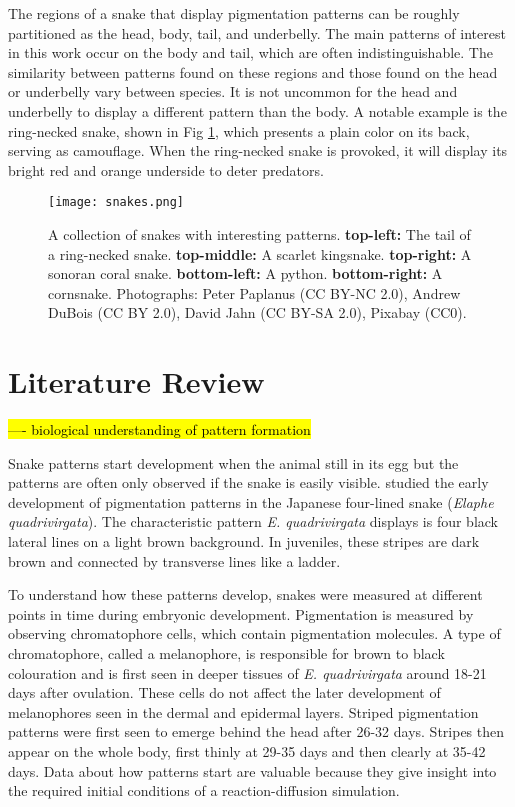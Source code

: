 The regions of a snake that display pigmentation patterns can be roughly partitioned as the head, body, tail, and underbelly. The main patterns of interest in this work occur on the body and tail, which are often indistinguishable. The similarity between patterns found on these regions and those found on the head or underbelly vary between species. It is not uncommon for the head and underbelly to display a different pattern than the body. A notable example is the ring-necked snake, shown in Fig \ref{fig:realSnakePatterns}, which presents a plain color on its back, serving as camouflage. When the ring-necked snake is provoked, it will display its bright red and orange underside to deter predators.


\begin{figure}[hb]
	\centering
	\texttt{[image: snakes.png]}
	\caption{A collection of snakes with interesting patterns. \textbf{top-left:} The tail of a ring-necked snake. \textbf{top-middle:} A scarlet kingsnake. \textbf{top-right:} A sonoran coral snake. \textbf{bottom-left:} A python. \textbf{bottom-right:} A cornsnake. \textcolor{citation-gray}{Photographs: Peter Paplanus (CC BY-NC 2.0), Andrew DuBois (CC BY 2.0), David Jahn (CC BY-SA 2.0), Pixabay (CC0).}}
	\label{fig:realSnakePatterns}
\end{figure}

\section{Literature Review}

\hl{---- biological understanding of pattern formation}

Snake patterns start development when the animal still in its egg but the patterns are often only observed if the snake is easily visible. \citet{murakami2018} studied the early development of pigmentation patterns in the Japanese four-lined snake (\textit{Elaphe quadrivirgata}). The characteristic pattern \textit{E. quadrivirgata} displays is four black lateral lines on a light brown background. In juveniles, these stripes are dark brown and connected by transverse lines like a ladder. 
 
To understand how these patterns develop, snakes were measured at different points in time during embryonic development. Pigmentation is measured by observing chromatophore cells, which contain pigmentation molecules. A type of chromatophore, called a melanophore, is responsible for brown to black colouration and is first seen in deeper tissues of \textit{E. quadrivirgata} around 18-21 days after ovulation. These cells do not affect the later development of melanophores seen in the dermal and epidermal layers. Striped pigmentation patterns were first seen to emerge behind the head after 26-32 days. Stripes then appear on the whole body, first thinly at 29-35 days and then clearly at 35-42 days. Data about how patterns start are valuable because they give insight into the required initial conditions of a reaction-diffusion simulation.

